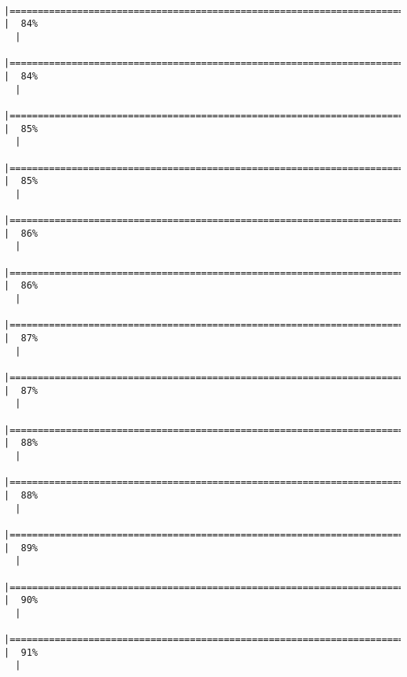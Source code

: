 \documentclass[12pt]{article}
\begin{document}
\begin{verbatim}
  |===========================================================================               |  84%
  |                                                                                                
  |============================================================================              |  84%
  |                                                                                                
  |============================================================================              |  85%
  |                                                                                                
  |=============================================================================             |  85%
  |                                                                                                
  |=============================================================================             |  86%
  |                                                                                                
  |==============================================================================            |  86%
  |                                                                                                
  |==============================================================================            |  87%
  |                                                                                                
  |===============================================================================           |  87%
  |                                                                                                
  |===============================================================================           |  88%
  |                                                                                                
  |================================================================================          |  88%
  |                                                                                                
  |================================================================================          |  89%
  |                                                                                                
  |=================================================================================         |  90%
  |                                                                                                
  |==================================================================================        |  91%
  |                                                                                                

\end{verbatim}
\end{document}
